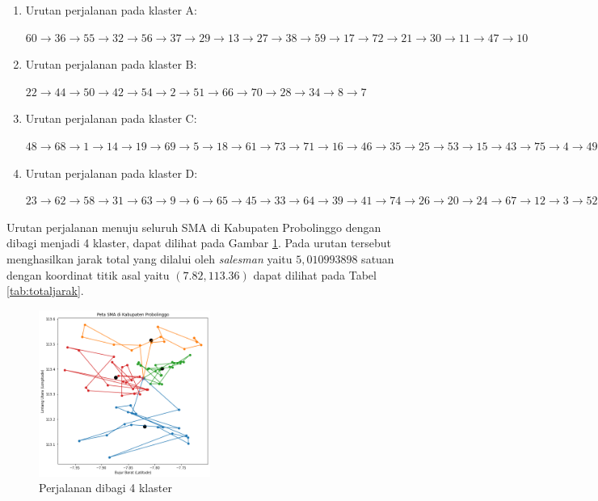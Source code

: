 \begin{enumerate}

\item Urutan perjalanan pada klaster A:

$60\rightarrow36\rightarrow55\rightarrow32\rightarrow56\rightarrow37\rightarrow29\rightarrow13\rightarrow27\rightarrow38\rightarrow59\rightarrow17\rightarrow72\rightarrow21\rightarrow30\rightarrow11\rightarrow47\rightarrow10$

\item Urutan perjalanan pada klaster B:

$22\rightarrow44\rightarrow50\rightarrow42\rightarrow54\rightarrow2\rightarrow51\rightarrow66\rightarrow70\rightarrow28\rightarrow34\rightarrow8\rightarrow7$

\item Urutan perjalanan pada klaster C:

$48\rightarrow68\rightarrow1\rightarrow14\rightarrow19\rightarrow69\rightarrow5\rightarrow18\rightarrow61\rightarrow73\rightarrow71\rightarrow16\rightarrow46\rightarrow35\rightarrow25\rightarrow53\rightarrow15\rightarrow43\rightarrow75\rightarrow4\rightarrow49\rightarrow40\rightarrow57$

\item Urutan perjalanan pada klaster D:

$23\rightarrow62\rightarrow58\rightarrow31\rightarrow63\rightarrow9\rightarrow6\rightarrow65\rightarrow45\rightarrow33\rightarrow64\rightarrow39\rightarrow41\rightarrow74\rightarrow26\rightarrow20\rightarrow24\rightarrow67\rightarrow12\rightarrow3\rightarrow52$

\end{enumerate}

Urutan perjalanan menuju seluruh SMA di Kabupaten Probolinggo dengan dibagi menjadi 4 klaster, dapat dilihat pada Gambar \ref{fig:hasil_mtsp4}. Pada urutan tersebut menghasilkan jarak total yang dilalui oleh \textit{salesman} yaitu $5,010993898$ satuan dengan koordinat titik asal yaitu $(7.82, 113.36)$ dapat dilihat pada Tabel \ref{tab:totaljarak}.


\begin{figure}[H]
\centering
\includegraphics[width=0.5\textwidth]{Gambar/hasil_mtsp/4}
\caption{Perjalanan dibagi 4 klaster}
\label{fig:hasil_mtsp4}
\end{figure}

